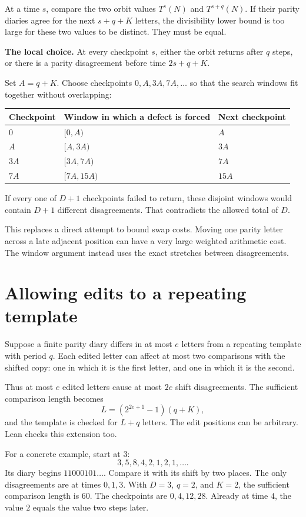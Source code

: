 \documentclass[11pt]{article}
\begin{document}
At a time $s$, compare the two orbit values $T^s(N)$ and
$T^{s+q}(N)$. If their parity diaries agree for the next $s+q+K$
letters, the divisibility lower bound is too large for these two
values to be distinct. They must be equal.

\begin{keyidea}
\textbf{The local choice.} At every checkpoint $s$, either the orbit
returns after $q$ steps, or there is a parity disagreement before
time $2s+q+K$.
\end{keyidea}
Set $A=q+K$. Choose checkpoints $0,A,3A,7A,\ldots$ so that the
search windows fit together without overlapping:
\begin{center}
\begin{tabular}{lll}
\toprule
Checkpoint&Window in which a defect is forced&Next checkpoint\\
\midrule
$0$&$[0,A)$&$A$\\
$A$&$[A,3A)$&$3A$\\
$3A$&$[3A,7A)$&$7A$\\
$7A$&$[7A,15A)$&$15A$\\
\bottomrule
\end{tabular}
\end{center}
If every one of $D+1$ checkpoints failed to return, these disjoint
windows would contain $D+1$ different disagreements. That contradicts
the allowed total of $D$.

This replaces a direct attempt to bound swap costs. Moving one parity
letter across a late adjacent position can have a very large weighted
arithmetic cost. The window argument instead uses the exact stretches
between disagreements.

\newpage
\section{Allowing edits to a repeating template}
Suppose a finite parity diary differs in at most $e$ letters from a
repeating template with period $q$. Each edited letter can affect at
most two comparisons with the shifted copy: one in which it is the
first letter, and one in which it is the second.

Thus at most $e$ edited letters cause at most $2e$ shift disagreements.
The sufficient comparison length becomes
\[
L=(2^{2e+1}-1)(q+K),
\]
and the template is checked for $L+q$ letters. The edit positions can
be arbitrary. Lean checks this extension too.

For a concrete example, start at $3$:
\[
3,5,8,4,2,1,2,1,\ldots.
\]
Its diary begins $11000101\ldots$. Compare it with its shift by two
places. The only disagreements are at times $0,1,3$. With $D=3$,
$q=2$, and $K=2$, the sufficient comparison length is $60$.
The checkpoints are $0,4,12,28$. Already at time $4$, the value $2$
equals the value two steps later.
\end{document}
